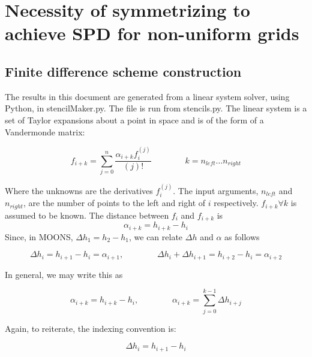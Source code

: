 \documentclass[landscape]{article}
\begin{document}
\doublespacing
\MOONSTITLE
\maketitle

\section{Necessity of symmetrizing to achieve SPD for non-uniform grids}

\subsection{Finite difference scheme construction}

The results in this document are generated from a linear system solver, using Python, in stencilMaker.py. The file is run from stencils.py. The linear system is a set of Taylor expansions about a point in space and is of the form of a Vandermonde matrix:

\begin{equation}
  f_{i+k}
  =
  \sum_{j=0}^n
  \frac{\alpha_{i+k} f_{i}^{(j)}}{(j)!}
  \qquad \qquad
  k = n_{left} \dots n_{right}
\end{equation}

Where the unknowns are the derivatives $f_i^{(j)}$. The input arguments, $n_{left}$ and $n_{right}$, are the number of points to the left and right of $i$ respectively. $f_{i+k}\forall k$ is assumed to be known. The distance between $f_{i}$ and $f_{i+k}$ is
\begin{equation}
  \alpha_{i+k}
  =
  h_{i+k} - h_{i}
\end{equation}
Since, in MOONS, $\Delta h_1 = h_2 - h_1$, we can relate $\Delta h$ and $\alpha$ as follows

\begin{equation}
  \Delta h_{i} = h_{i+1} - h_{i} = \alpha_{i+1}
  ,\qquad \qquad
  \Delta h_{i} + \Delta h_{i+1} = h_{i+2} - h_{i} = \alpha_{i+2}
\end{equation}

In general, we may write this as

\begin{equation}
  \alpha_{i+k} = h_{i+k} - h_{i}
  ,\qquad \qquad
  \alpha_{i+k} = \sum_{j=0}^{k-1} \Delta h_{i+j}
\end{equation}

Again, to reiterate, the indexing convention is:

\begin{equation}
  \boxed{
  \Delta h_{i}
  =
  h_{i+1} - h_{i}
  }
\end{equation}
\end{document}
